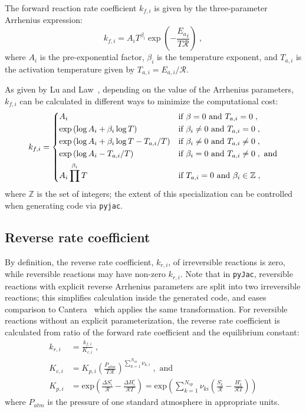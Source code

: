 \documentclass[12pt,number,sort&compress]{elsarticle}
\newcommand{\ns}{N_{sp}}
\newcommand{\Ru}{\mathcal{R}}
\begin{document}
The forward reaction rate coefficient $k_{f, i}$ is given by the three-parameter Arrhenius expression:
\begin{equation}
  \label{e:arrhenius}
  {k_{f, i}} = A_{i} T^{\beta_{i}} \operatorname{exp}\left({- \frac{{E_{a}}_{i}}{T \Ru}}\right) \;,
\end{equation}
where $A_i$ is the pre-exponential factor, $\beta_i$ is the temperature exponent, and $T_{a, i}$ is the activation temperature given by $T_{a, i} = E_{a, i} / \mathcal{R}$.

As given by Lu and Law~\cite{Lu:2009gh}, depending on the value of the Arrhenius parameters, $k_{f,i}$ can be calculated in different ways to minimize the computational cost:
\begin{equation}
  k_{f,i} =
  \begin{dcases}
  A_i & \text{if } \beta = 0 \text{ and } T_{a,i} = 0 \;, \\
  \exp \left( \log A_i + \beta_i \log T \right)   & \text{if } \beta_i \neq 0 \text{ and } T_{a, i} = 0 \;, \\
  \exp \left( \log A_i + \beta_i \log T - T_{a, i} / T \right) & \text{if } \beta_i \neq 0 \text{ and } T_{a, i} \neq 0 \;, \\
  \exp \left( \log A_i - T_{a, i} / T \right)  & \text{if } \beta_i = 0 \text{ and } T_{a, i} \neq 0 \;, \text{ and} \\
  A_i \prod^{\beta_i} T & \text{if } T_{a, i} = 0 \text{ and } \beta_i \in \mathbb{Z} \;,
  \end{dcases}
\end{equation}
where $\mathbb{Z}$ is the set of integers; the extent of this specialization can be controlled when generating code via \texttt{pyjac}.

\subsection{Reverse rate coefficient}
By definition, the reverse rate coefficient, ${k_{r, i}}$, of irreversible reactions is zero, while reversible reactions may have non-zero ${k_{r, i}}$.
Note that in \texttt{pyJac}, reversible reactions with explicit reverse Arrhenius parameters are split into two irreversible reactions; this simplifies calculation inside the generated code, and eases comparison to Cantera~\cite{Goodwin:2015aa} which applies the same transformation.
For reversible reactions without an explicit parameterization, the reverse rate coefficient is calculated from ratio of the forward rate coefficient and the equilibrium constant:
\begin{align}
 {k_{r, i}} &= \frac{{k_{f, i}}}{{K_{c, i}}}\; , \label{e:kr}\\
 {K_{c, i}} &= {K_{p,i}}\left(\frac{P_{atm}}{T \Ru}\right)^{\sum_{k=1}^{\ns} \nu_{k,i}} \; ,\text{ and} \label{e:kc}\\
 {K_{p,i}} &= \text{exp}\left(\frac{\Delta S^{\circ}_i}{\Ru} - \frac{\Delta H^{\circ}_i}{\Ru T}\right) = \text{exp}\left(\sum_{k=1}^{\ns}\nu_{ki}\left(\frac{S^{\circ}_k}{\Ru} - \frac{H^{\circ}_k}{\Ru T}\right)\right) \label{e:kp}
\end{align}
where $P_{atm}$ is the pressure of one standard atmosphere in appropriate units.
\end{document}
